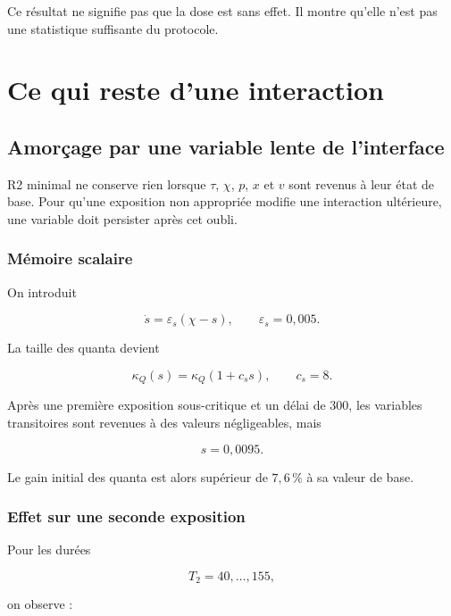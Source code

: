 Ce résultat ne signifie pas que la dose est sans effet. Il montre
qu'elle n'est pas une statistique suffisante du protocole.

\part{Ce qui reste d’une interaction}

\chapter{Amorçage par une variable lente de l'interface}\label{t2-amorcage-par-une-variable-lente-de-linterface}

R2 minimal ne conserve rien lorsque \(\tau\), \(\chi\), \(p\), \(x\) et \(v\) sont revenus à leur état de base. Pour qu'une exposition non appropriée modifie une interaction ultérieure, une variable doit persister après cet oubli.

\section{Mémoire scalaire}\label{t2-memoire-scalaire}

On introduit

\[
\dot s
=
\varepsilon_s(\chi-s),
\qquad
\varepsilon_s=0{,}005.
\]

La taille des quanta devient

\[
\kappa_Q(s)
=
\kappa_Q(1+c_ss),
\qquad
c_s=8.
\]

Après une première exposition sous-critique et un délai de \(300\), les variables transitoires sont revenues à des valeurs négligeables, mais

\[
s=0{,}0095.
\]

Le gain initial des quanta est alors supérieur de \(7{,}6\,\%\) à sa
valeur de base.

\section{Effet sur une seconde exposition}\label{t2-effet-sur-une-seconde-exposition}

Pour les durées

\[
T_2=40,\ldots,155,
\]

on observe :

